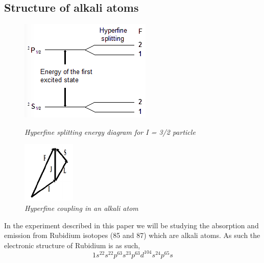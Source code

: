 \documentclass[twocolumn]{article}
\begin{document}
\subsection{Structure of alkali atoms}
\begin{figure}
\begin{minipage}{0.45\linewidth}
\includegraphics[width=\linewidth]{pictures/hyperfine-splitting.png}
\caption{\textit{Hyperfine splitting energy diagram for I = 3/2 particle
\cite{ref:3}}}
\label{fig:3}
\end{minipage}
\hfill
\begin{minipage}{0.45\linewidth}
\includegraphics[width=0.3\linewidth]{pictures/hyperfine-vectors.png}
\caption{\textit{Hyperfine coupling in an alkali atom \cite{ref:3}}}
\label{fig:4}
\end{minipage}
\end{figure}
In the experiment described in this paper we will be studying the absorption 
and emission from Rubidium isotopes (85 and 87) which are alkali atoms. As such the electronic structure of Rubidium is as such,
\begin{equation*}
1s^22s^22p^63s^23p^63d^104s^24p^65s
\end{equation*}
\end{document}
